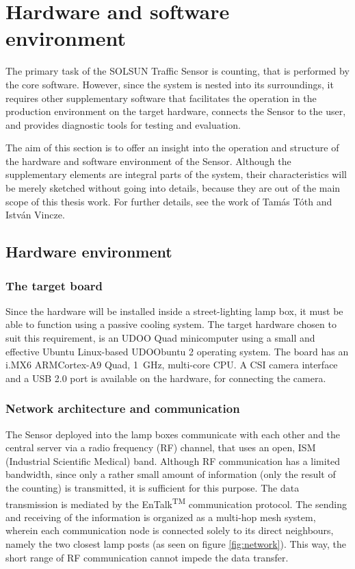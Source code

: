 \chapter{Hardware and software environment}\label{chap:Environment}
The primary task of the SOLSUN Traffic Sensor is counting, that is performed by the core software.
However, since the system is nested into its surroundings, it requires other supplementary software that facilitates the operation in the production environment on the target hardware, connects the Sensor to the user, and provides diagnostic tools for testing and evaluation.

The aim of this section is to offer an insight into the operation and structure of the hardware and software environment of the Sensor.
Although the supplementary elements are integral parts of the system, their characteristics will be merely sketched without going into details, because they are out of the main scope of this thesis work.
For further details, see the work of Tam{\'a}s T{\'o}th\cite{Toth2016} and Istv{\'a}n Vincze\cite{Vincze2016}.
\section{Hardware environment}
\subsection{The target board}
Since the hardware will be installed inside a street-lighting lamp box, it must be able to function using a passive cooling system.
The target hardware chosen to suit this requirement, is an UDOO Quad minicomputer using a small and effective Ubuntu Linux-based UDOObuntu 2 operating system.
The board has an i.MX6 ARM\reg Cortex\reg-A9 Quad, \SI{1}{GHz}, multi-core CPU\cite{UDOO, UDOO2}.
A CSI camera interface and a USB 2.0 port is available on the hardware, for connecting the camera.

\subsection{Network architecture and communication}
The Sensor deployed into the lamp boxes communicate with each other and the central server via a radio frequency (RF) channel, that uses an open, ISM (Industrial Scientific Medical) band.
Although RF communication has a limited bandwidth, since only a rather small amount of information (only the result of the counting) is transmitted, it is sufficient for this purpose.
The data transmission is mediated by the EnTalk\textsuperscript{TM} communication protocol\cite{EnTalk}.
The sending and receiving of the information is organized as a multi-hop mesh system, wherein each communication node is connected solely to its direct neighbours, namely the two closest lamp posts (as seen on figure \ref{fig:network}).
This way, the short range of RF communication cannot impede the data transfer.

